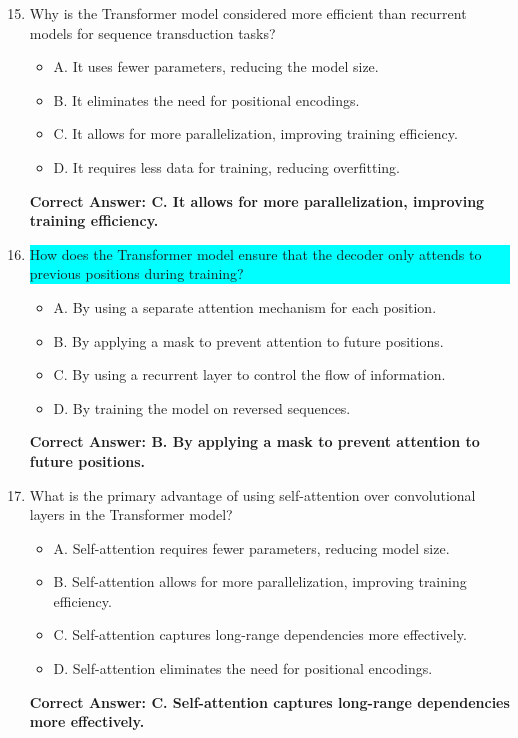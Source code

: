 \begin{figure*}\ContinuedFloat
\centering
\begin{tcolorbox}[width=\textwidth,fontupper=\footnotesize,title=Repeated Baseline Questions - Continued]
\begin{enumerate}
    \setcounter{enumi}{14}
    \item Why is the Transformer model considered more efficient than recurrent models for sequence transduction tasks?
    \begin{itemize}
        \item A. It uses fewer parameters, reducing the model size.
        \item B. It eliminates the need for positional encodings.
        \item C. It allows for more parallelization, improving training efficiency.
        \item D. It requires less data for training, reducing overfitting.
    \end{itemize}
    \textbf{Correct Answer: C. It allows for more parallelization, improving training efficiency.}
    
    \item \colorbox{cyan}{\parbox{0.93\textwidth}{How does the Transformer model ensure that the decoder only attends to previous positions during training?}}
    \begin{itemize}
        \item A. By using a separate attention mechanism for each position.
        \item B. By applying a mask to prevent attention to future positions.
        \item C. By using a recurrent layer to control the flow of information.
        \item D. By training the model on reversed sequences.
    \end{itemize}
    \textbf{Correct Answer: B. By applying a mask to prevent attention to future positions.}

    \item What is the primary advantage of using self-attention over convolutional layers in the Transformer model?
    \begin{itemize}
        \item A. Self-attention requires fewer parameters, reducing model size.
        \item B. Self-attention allows for more parallelization, improving training efficiency.
        \item C. Self-attention captures long-range dependencies more effectively.
        \item D. Self-attention eliminates the need for positional encodings.
    \end{itemize}
    \textbf{Correct Answer: C. Self-attention captures long-range dependencies more effectively.}


\end{enumerate}
\end{tcolorbox}
\end{figure*}
